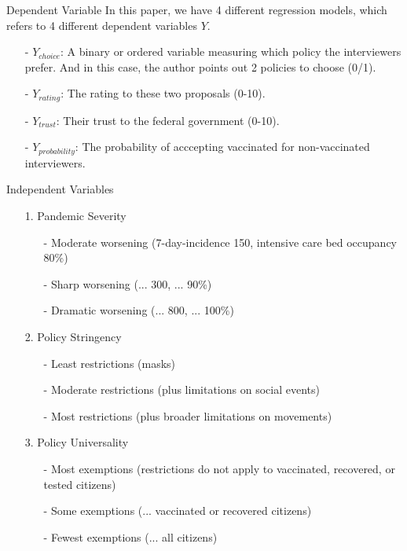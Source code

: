 \documentclass{beamer}
\begin{document}
\begin{frame}{Dependent Variable}
	\noindent In this paper, we have 4 different regression models, which refers to 4 different dependent variables $Y$.
	\par
	\begin{itemize}
		\item[-] $Y_{choice}$: A binary or ordered variable measuring which policy the interviewers prefer. And in this case, the author points out 2 policies to choose (0/1).
		\item[-] $Y_{rating}$: The rating to these two proposals (0-10).
		\item[-] $Y_{trust}$: Their trust to the federal government (0-10).
		\item[-] $Y_{probability}$: The probability of acccepting vaccinated for non-vaccinated interviewers. 
	\end{itemize}
\end{frame}

\begin{frame}{Independent Variables}
\begin{itemize}
	\item[1.] Pandemic Severity
	\begin{enumerate}
		\item[-] Moderate worsening (7-day-incidence 150, intensive care bed occupancy 80\%)
		\item[-] Sharp worsening (... 300, ... 90\%)
		\item[-] Dramatic worsening (... 800, ... 100\%)
	\end{enumerate}
	\item[2.] Policy Stringency
	\begin{enumerate}
		\item[-]  Least restrictions (masks)
		\item[-]  Moderate restrictions (plus limitations on social events)
		\item[-]  Most restrictions (plus broader limitations on movements)
	\end{enumerate}
	\item[3.] Policy Universality
	\begin{enumerate}
		\item[-] Most exemptions (restrictions do not apply to vaccinated, recovered, or tested citizens)
		\item[-] Some exemptions (... vaccinated or recovered citizens)
		\item[-] Fewest exemptions (... all citizens)
	\end{enumerate}
\end{itemize}
\end{frame}
\end{document}
